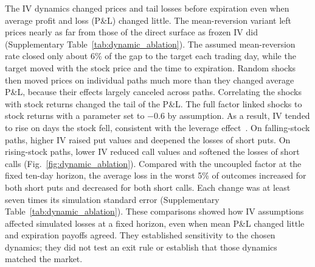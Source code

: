 The IV dynamics changed prices and tail losses before expiration even when average profit and loss (P\&L) changed little. The mean-reversion variant left prices nearly as far from those of the direct surface as frozen IV did (Supplementary Table~\ref{tab:dynamic_ablation}). The assumed mean-reversion rate closed only about 6\% of the gap to the target each trading day, while the target moved with the stock price and the time to expiration. Random shocks then moved prices on individual paths much more than they changed average P\&L, because their effects largely canceled across paths. Correlating the shocks with stock returns changed the tail of the P\&L. The full factor linked shocks to stock returns with a parameter set to $-0.6$ by assumption. As a result, IV tended to rise on days the stock fell, consistent with the leverage effect~\cite{cont2001}. On falling-stock paths, higher IV raised put values and deepened the losses of short puts. On rising-stock paths, lower IV reduced call values and softened the losses of short calls (Fig.~\ref{fig:dynamic_ablation}). Compared with the uncoupled factor at the fixed ten-day horizon, the average loss in the worst 5\% of outcomes increased for both short puts and decreased for both short calls. Each change was at least seven times its simulation standard error (Supplementary Table~\ref{tab:dynamic_ablation}). These comparisons showed how IV assumptions affected simulated losses at a fixed horizon, even when mean P\&L changed little and expiration payoffs agreed. They established sensitivity to the chosen dynamics; they did not test an exit rule or establish that those dynamics matched the market.

